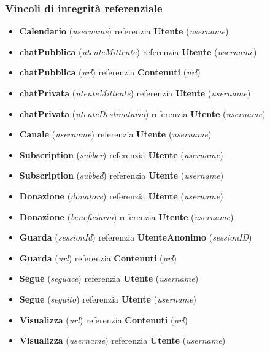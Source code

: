 \subsubsection*{Vincoli di integrità referenziale}
\begin{itemize}
  \item \textbf{Calendario} (\textit{username}) referenzia \textbf{Utente} (\textit{username})
  \item \textbf{chatPubblica} (\textit{utenteMittente}) referenzia \textbf{Utente} (\textit{username})
  \item \textbf{chatPubblica} (\textit{url}) referenzia \textbf{Contenuti} (\textit{url}) 
  \item \textbf{chatPrivata} (\textit{utenteMittente}) referenzia \textbf{Utente} (\textit{username})
  \item \textbf{chatPrivata} (\textit{utenteDestinatario}) referenzia \textbf{Utente} (\textit{username})
  \item \textbf{Canale} (\textit{username}) referenzia \textbf{Utente} (\textit{username})
  \item \textbf{Subscription} (\textit{subber}) referenzia \textbf{Utente} (\textit{username})
  \item \textbf{Subscription} (\textit{subbed}) referenzia \textbf{Utente} (\textit{username})
  \item \textbf{Donazione} (\textit{donatore}) referenzia \textbf{Utente} (\textit{username})
  \item \textbf{Donazione} (\textit{beneficiario}) referenzia \textbf{Utente} (\textit{username})
  \item \textbf{Guarda} (\textit{sessionId}) referenzia \textbf{UtenteAnonimo} (\textit{sessionID})
  \item \textbf{Guarda} (\textit{url}) referenzia \textbf{Contenuti} (\textit{url})
  \item \textbf{Segue} (\textit{seguace}) referenzia \textbf{Utente} (\textit{username})
  \item \textbf{Segue} (\textit{seguito}) referenzia \textbf{Utente} (\textit{username})
  \item \textbf{Visualizza} (\textit{url}) referenzia \textbf{Contenuti} (\textit{url})
  \item \textbf{Visualizza} (\textit{username}) referenzia \textbf{Utente} (\textit{username})
\end{itemize}
